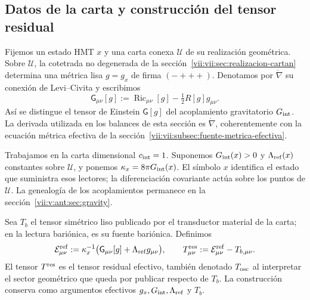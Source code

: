 \subsection{Datos de la carta y construcción del tensor residual}
\label{vii:vii:subsec:datos-tensor-residual}

Fijemos un estado HMT \(x\) y una carta conexa \(\mathcal U\) de su
realización geométrica. Sobre \(\mathcal U\), la cotetrada no degenerada
de la sección~\ref{vii:vii:sec:realizacion-cartan} determina una métrica lisa
\(g=g_x\) de firma \((-+++)\). Denotamos por
\(\mathring\nabla\) su conexión de Levi--Civita y escribimos
\[
 \mathsf G_{\mu\nu}[g]
 :=\operatorname{Ric}_{\mu\nu}[g]-\tfrac12R[g]g_{\mu\nu}.
\]
Así se distingue el tensor de Einstein \(\mathsf G[g]\) del acoplamiento
gravitatorio \(G_{\rm int}\). La derivada utilizada en los balances
de esta sección es \(\mathring\nabla\), coherentemente con la ecuación
métrica efectiva de la sección~\ref{vii:vii:subsec:fuente-metrica-efectiva}.

Trabajamos en la carta dimensional \(c_{\rm int}=1\). Suponemos
\(G_{\rm int}(x)>0\) y \(\Lambda_{\rm ref}(x)\) constantes sobre
\(\mathcal U\), y ponemos \(\kappa_x=8\pi G_{\rm int}(x)\).
El símbolo \(x\) identifica el estado que suministra esos lectores;
la diferenciación covariante actúa sobre los puntos de \(\mathcal U\).
La genealogía de los acoplamientos permanece en la
sección~\ref{vii:v:ant:sec:gravity}.

Sea \(T_b\) el tensor simétrico liso publicado por el transductor material
de la carta; en la lectura bariónica, es su fuente bariónica. Definimos
\begin{equation}
 \mathcal E^{\rm ref}_{\mu\nu}
 :=\kappa_x^{-1}\bigl(\mathsf G_{\mu\nu}[g]
                            +\Lambda_{\rm ref}g_{\mu\nu}\bigr),
 \qquad
 T^{\rm res}_{\mu\nu}:=\mathcal E^{\rm ref}_{\mu\nu}-T_{b,\mu\nu}.
 \label{vii:vii:eq:residual-definicion}
\end{equation}
El tensor \(T^{\rm res}\) es el tensor residual efectivo, también
denotado \(T_{\rm osc}\) al interpretar el sector geométrico que queda
por publicar respecto de \(T_b\). La construcción conserva como
argumentos efectivos \(g_x,G_{\rm int},\Lambda_{\rm ref}\) y \(T_b\).

